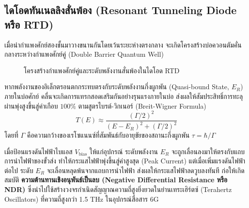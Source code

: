 \subsection{ไดโอดทันเนลลิงสั่นพ้อง (Resonant Tunneling Diode หรือ RTD)}
เมื่อนำกำแพงศักย์สองชั้นมาวางขนานกันโดยเว้นระยะห่างตรงกลาง จะเกิดโครงสร้างบ่อควอนตัมคั่นกลางระหว่างกำแพงศักย์คู่ (Double Barrier Quantum Well)

\begin{figure}[H]
\centering
{}
\caption{โครงสร้างกำแพงศักย์คู่และระดับพลังงานสั่นพ้องในไดโอด RTD}
\label{fig_rtd_profile}
\end{figure}

หากพลังงานของอิเล็กตรอนตกกระทบตรงกับระดับพลังงานกึ่งผูกพัน (Quasi-bound State, $E_R$) ภายในบ่อศักย์ คลื่นจะเกิดการแทรกสอดเสริมกันอย่างรุนแรงภายในบ่อ ส่งผลให้สัมประสิทธิ์การทะลุผ่านพุ่งสูงขึ้นสู่ค่าเกือบ $100\%$ ตามสูตรไบรต์-วิกเนอร์ (Breit-Wigner Formula)
\begin{equation}
T(E) \approx \frac{(\Gamma/2)^2}{(E - E_R)^2 + (\Gamma/2)^2}
\end{equation}
โดยที่ $\Gamma$ คือความกว้างของเรโซแนนซ์ที่สัมพันธ์กับอายุขัยของสถานะกึ่งผูกพัน $\tau = \hbar/\Gamma$

เมื่อป้อนแรงดันไฟฟ้าไบแอส $V_{\text{bias}}$ ให้แก่อุปกรณ์ ระดับพลังงาน $E_R$ จะถูกเลื่อนลงมาให้ตรงกับแถบการนำไฟฟ้าของขั้วส่ง ทำให้กระแสไฟฟ้าพุ่งขึ้นสู่ค่าสูงสุด (Peak Current) แต่เมื่อเพิ่มแรงดันไฟฟ้าต่อไป ระดับ $E_R$ จะเลื่อนหลุดพ้นจากแถบการนำไฟฟ้า ส่งผลให้กระแสไฟฟ้าลดวูบลงทันที ก่อให้เกิดสมบัติ \textbf{ความต้านทานเชิงอนุพันธ์เป็นลบ (Negative Differential Resistance หรือ NDR)} ซึ่งนำไปใช้สร้างวงจรกำเนิดสัญญาณความถี่สูงยิ่งยวดในย่านเทระเฮิร์ตซ์ (Terahertz Oscillators) ที่ความถี่สูงกว่า 1.5 THz ในอุปกรณ์สื่อสาร 6G

